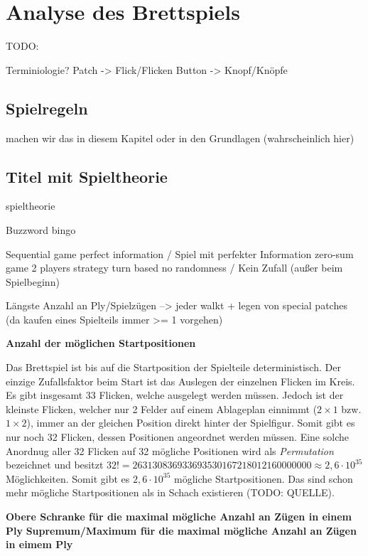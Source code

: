 
\chapter{Analyse des Brettspiels}
\label{chapter:analyse-des-bretspiels}

TODO:

Terminiologie?
Patch -> Flick/Flicken
Button -> Knopf/Knöpfe

\section{Spielregeln}

machen wir das in diesem Kapitel oder in den Grundlagen (wahrscheinlich hier)


\section{Titel mit Spieltheorie}

spieltheorie

Buzzword bingo

Sequential game
perfect information / Spiel mit perfekter Information
zero-sum game
2 players
strategy
turn based
no randomness / Kein Zufall (außer beim Spielbeginn)

Längste Anzahl an Ply/Spielzügen --> jeder walkt + legen von special patches (da kaufen eines Spielteils immer >= 1 vorgehen)

\textbf{Anzahl der möglichen Startpositionen}

Das Brettspiel ist bis auf die Startposition der Spielteile deterministisch. Der einzige Zufallsfaktor beim Start ist das Auslegen der einzelnen Flicken im Kreis. Es gibt insgesamt 33 Flicken, welche ausgelegt werden müssen. Jedoch ist der kleinste Flicken, welcher nur 2 Felder auf einem Ablageplan einnimmt ($2\times1$ bzw. $1\times2$), immer an der gleichen Position direkt hinter der Spielfigur. Somit gibt es nur noch 32 Flicken, dessen Positionen angeordnet werden müssen. Eine solche Anordnug aller 32 Flicken auf 32 mögliche Positionen wird als \emph{Permutation} bezeichnet und besitzt $32! = 263130836933693530167218012160000000 \approx 2,6 \cdot 10^{35}$ Möglichkeiten. Somit gibt es $2,6 \cdot 10^{35}$ mögliche Startpositionen. Das sind schon mehr mögliche Startpositionen als in Schach existieren (TODO: QUELLE).

\textbf{Obere Schranke für die maximal mögliche Anzahl an Zügen in einem Ply}
\textbf{Supremum/Maximum für die maximal mögliche Anzahl an Zügen in eimem Ply}

